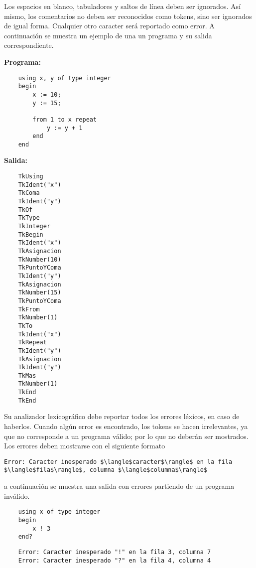 \documentclass[letterpaper,10pt]{article}
\begin{document}
Los espacios en blanco, tabuladores y saltos de línea deben ser ignorados. Así mismo, los comentarios no deben ser reconocidos como tokens, sino ser ignorados de igual forma. Cualquier otro caracter será reportado como error. A continuación se muestra un ejemplo de una un programa y su salida correspondiente.

\newpage

\textbf{Programa:}

\begin{lstlisting}
    using x, y of type integer
    begin
        x := 10;
        y := 15;
        
        from 1 to x repeat
            y := y + 1
        end
    end
\end{lstlisting}

\textbf{Salida:}

\begin{lstlisting}
    TkUsing
    TkIdent("x")
    TkComa
    TkIdent("y")
    TkOf
    TkType
    TkInteger
    TkBegin
    TkIdent("x")
    TkAsignacion
    TkNumber(10)
    TkPuntoYComa
    TkIdent("y")
    TkAsignacion
    TkNumber(15)
    TkPuntoYComa
    TkFrom
    TkNumber(1)
    TkTo
    TkIdent("x")
    TkRepeat
    TkIdent("y")
    TkAsignacion
    TkIdent("y")
    TkMas
    TkNumber(1)
    TkEnd
    TkEnd
\end{lstlisting}

Su analizador lexicográfico debe reportar todos los errores léxicos, en caso de haberlos. Cuando algún error es encontrado, los tokens se hacen irrelevantes, ya que no corresponde a un programa válido; por lo que no deberán ser mostrados. Los errores deben mostrarse con el siguiente formato

\begin{lstlisting}[mathescape=true]
    Error: Caracter inesperado $\langle$caracter$\rangle$ en la fila $\langle$fila$\rangle$, columna $\langle$columna$\rangle$
\end{lstlisting}

\noindent
a continuación se muestra una salida con errores partiendo de un programa inválido.

\begin{lstlisting}
    using x of type integer
    begin
        x ! 3
    end?
\end{lstlisting}

\begin{lstlisting}
    Error: Caracter inesperado "!" en la fila 3, columna 7
    Error: Caracter inesperado "?" en la fila 4, columna 4
\end{lstlisting}
\end{document}
